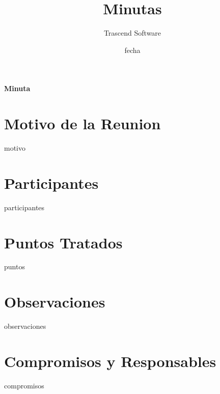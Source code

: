 \documentclass{article}
\title{Minutas}
\date{
fecha
}
\author{Trascend Software}
\begin{document}


\maketitle %
\newpage %
\begin{center}

	\huge{\bf  Minuta}

\end{center}
\section{\bf  Motivo de la Reunion}
motivo
\section{\bf  Participantes}
participantes

\section{\bf Puntos Tratados}
puntos

\section{\bf Observaciones}
observaciones

\section{\bf Compromisos y Responsables}
compromisos
\end{document}
